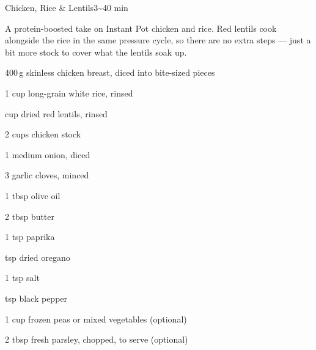 

\begin{recipebox}{Chicken, Rice \& Lentils}{3}{\textasciitilde40 min}

A protein-boosted take on Instant Pot chicken and rice. Red lentils cook
alongside the rice in the same pressure cycle, so there are no extra steps ---
just a bit more stock to cover what the lentils soak up.

\begin{ingredients}
  \item 400\,g skinless chicken breast, diced into bite-sized pieces
  \item 1 cup long-grain white rice, rinsed
  \item {} cup dried red lentils, rinsed
  \item 2 cups chicken stock
  \item 1 medium onion, diced
  \item 3 garlic cloves, minced
  \item 1 tbsp olive oil
  \item 2 tbsp butter
  \item 1 tsp paprika
  \item {} tsp dried oregano
  \item 1 tsp salt
  \item {} tsp black pepper
  \item 1 cup frozen peas or mixed vegetables (optional)
  \item 2 tbsp fresh parsley, chopped, to serve (optional)
\end{ingredients}


\end{recipebox}
